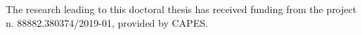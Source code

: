 The research leading to this doctoral thesis has received funding from the project n. 88882.380374/2019-01, provided by CAPES.